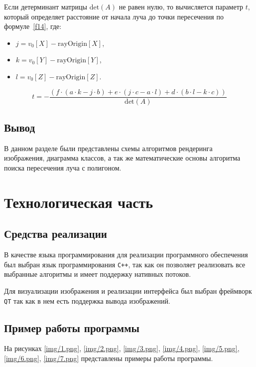 Если детерминант матрицы \(\text{det}(A)\) не равен нулю, то вычисляется параметр \(t\), который определяет расстояние от начала луча до точки пересечения по формуле~\ref{f14}, где:
\begin{itemize}
    \item \(j = v_0[X] - \text{rayOrigin}[X]\),
    \item \(k = v_0[Y] - \text{rayOrigin}[Y]\),
    \item \(l = v_0[Z] - \text{rayOrigin}[Z]\).
\end{itemize}

\begin{equation}
t = - \frac{(f \cdot (a \cdot k - j \cdot b) + e \cdot (j \cdot c - a \cdot l) + d \cdot (b \cdot l - k \cdot c))}{\text{det}(A)}
\label{f14}
\end{equation}

\section{Вывод}
В данном разделе были представлены схемы алгоритмов рендеринга изображения, диаграмма классов, а так же математические основы алгоритма поиска пересечения луча с полигоном.

\chapter{Технологическая часть}
\section{Средства реализации}
В качестве языка программирования для реализации программного
обеспечения был выбран язык программирования \texttt{C++}, так как он позволяет реализовать все выбранные алгоритмы и имеет поддержку нативных потоков.

Для визуализации изображения и реализации интерфейса был выбран фреймворк \texttt{QT} так как в нем есть поддержка вывода изображений.

\section{Пример работы программы}
На рисунках \ref{img/1.png}, \ref{img/2.png}, \ref{img/3.png}, \ref{img/4.png}, \ref{img/5.png}, \ref{img/6.png}, \ref{img/7.png} представлены примеры работы программы.



